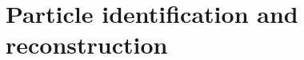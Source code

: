 \documentclass[../main.tex]{subfiles}
\begin{document}
\chapter{Particle identification and reconstruction}
\end{document}
